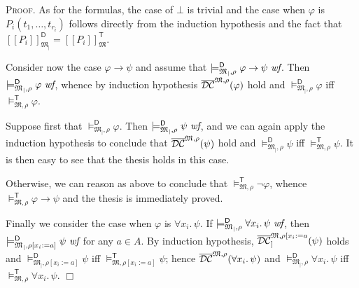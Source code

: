 \documentclass{article}
\newenvironment{proof}{\smallskip\textsc{Proof.}}{\hspace*{\fill}$\Box$}
\newcommand{\restrfun}[1]{\ensuremath{{#1}_|}}
\newcommand{\wf}{\ \mbox{\em wf}}
\newcommand{\intm}[3]{\ensuremath{[\![{#3}]\!]^{\mathsf{#1}}_{\mathfrak{#2}}}}
\newcommand{\mymodelss}[3]{\ensuremath{\models_{\mathfrak{#2},{#3}}^{\mathsf{#1}}}}
\newcommand{\semDC}[2][{\mathfrak M},\rho]{\ensuremath{\overline{\cal{DC}}^{#1}_{#2}}}
\def\sep{.\,}
\begin{document}
\begin{proof}
As for the formulas, the case of $\bot$ is trivial and the case when
$\varphi$ is $P_i(t_1,\ldots,t_{r_i})$ follows directly from the
induction hypothesis and the fact that
$\intm{D}{\restrfun M}{P_i}=\intm{T}M{P_i}$.

Consider now the case $\varphi\to\psi$ and assume that
$\mymodelss{D}{\restrfun M}\rho\varphi\to\psi\wf$.  Then
$\mymodelss{D}{\restrfun M}\rho\varphi\wf$, whence by induction
hypothesis $\semDC{}(\varphi)$ hold and
$\mymodelss{D}{\restrfun M}\rho\varphi$ iff $\mymodelss{T}M\rho\varphi$.

Suppose first that $\mymodelss{D}{\restrfun M}\rho\varphi$.  Then
$\mymodelss{D}{\restrfun M}\rho\psi\wf$, and we can again apply the
induction hypothesis to conclude that $\semDC{}(\psi)$ hold and
$\mymodelss{D}{\restrfun M}\rho\psi$ iff $\mymodelss{T}M\rho\psi$.
It is then easy to see that the thesis holds in this case.

Otherwise, we can reason as above to conclude that
$\mymodelss{T}M\rho\neg\varphi$, whence $\mymodelss{T}M\rho\varphi\to\psi$
and the thesis is immediately proved.

Finally we consider the case when $\varphi$ is $\forall x_i\sep\psi$.
If $\mymodelss{D}{\restrfun M}\rho\forall x_i\sep\psi\wf$, then
$\mymodelss{D}{\restrfun M}{\rho[x_i:=a]}\psi\wf$ for any $a\in A$.
By induction hypothesis, $\semDC[{\mathfrak M},\rho[x_i:=a]]{}(\psi)$
holds and $\mymodelss{D}{\restrfun M}{\rho[x_i:=a]}\psi$ iff
$\mymodelss{T}M{\rho[x_i:=a]}\psi$; hence $\semDC{}(\forall x_i\sep\psi)$
and $\mymodelss{D}{\restrfun M}\rho\forall x_i\sep\psi$ iff
$\mymodelss{T}M\rho\forall x_i\sep\psi$.
\end{proof}
\end{document}
